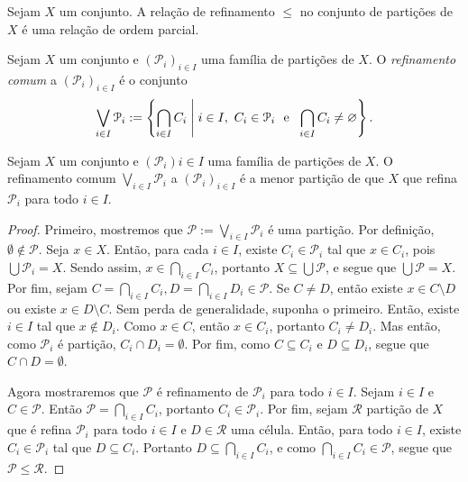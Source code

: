 \begin{prop}
Sejam $X$ um conjunto. A relação de refinamento $\leq$ no conjunto de partições de $X$ é uma relação de ordem parcial.
\end{prop}

\begin{defi}
Sejam $X$ um conjunto e $(\mathcal P_i)_{i \in I}$ uma família de partições de $X$. O \emph{refinamento comum} a $(\mathcal P_i)_{i \in I}$ é o conjunto
	\begin{equation*}
	\bigvee_{i \in I} \mathcal P_i := \left\{\bigcap_{i \in I} C_i \;\middle\vert\; i \in I,\  C_i \in \mathcal P_i \text{\ \ e\ \ } \bigcap_{i \in I} C_i \neq \varnothing \right\}.
	\end{equation*}
\end{defi}

\begin{prop}
Sejam $X$ um conjunto e $(\mathcal P_i){i \in I}$ uma família de partições de $X$. O refinamento comum $\bigvee_{i \in I} \mathcal P_i$ a $(\mathcal P_i)_{i \in I}$ é a menor partição de que $X$ que refina $\mathcal P_i$ para todo $i \in I$.
\end{prop}
\begin{proof}
Primeiro, mostremos que $\mathcal P := \bigvee_{i \in I} \mathcal P_i$ é uma partição. Por definição, $\emptyset \notin \mathcal P$. Seja $x \in X$. Então, para cada $i \in I$, existe $C_i \in \mathcal P_i$ tal que $x \in C_i$, pois $\bigcup \mathcal P_i = X$. Sendo assim, $x \in \bigcap_{i \in I} C_i$, portanto $X \subseteq \bigcup \mathcal P$, e segue que $\bigcup \mathcal P = X$. Por fim, sejam $C=\bigcap_{i \in I} C_i, D=\bigcap_{i \in I} D_i \in \mathcal P$. Se $C \neq D$, então existe $x \in C\setminus D$ ou existe $x \in D \setminus C$. Sem perda de generalidade, suponha o primeiro. Então, existe $i \in I$ tal que $x \notin D_i$. Como $x \in C$, então $x \in C_i$, portanto $C_i \neq D_i$. Mas então, como $\mathcal P_i$ é partição, $C_i \cap D_i = \emptyset$. Por fim, como $C \subseteq C_i$ e $D \subseteq D_i$, segue que $C \cap D = \emptyset$.

Agora mostraremos que $\mathcal P$ é refinamento de $\mathcal P_i$ para todo $i \in I$. Sejam $i \in I$ e $C \in \mathcal P$. Então $\mathcal P=\bigcap_{i \in I} C_i$, portanto $C_i \in \mathcal P_i$. Por fim, sejam $\mathcal R$ partição de $X$ que é refina $\mathcal P_i$ para todo $i \in I$ e $D \in \mathcal R$ uma célula. Então, para todo $i \in I$, existe $C_i \in \mathcal P_i$ tal que $D \subseteq C_i$. Portanto $D \subseteq \bigcap_{i \in I} C_i$, e como $\bigcap_{i \in I} C_i \in \mathcal P$, segue que $\mathcal P \leq \mathcal R$.
\end{proof}

